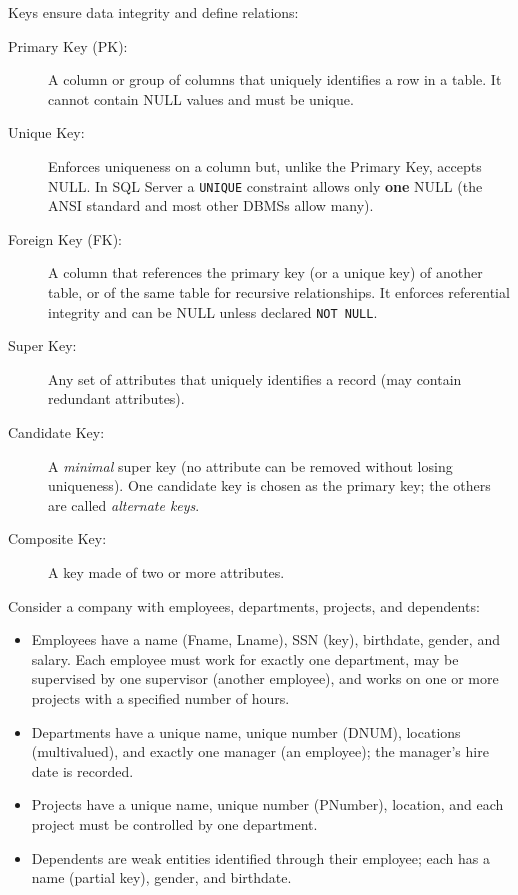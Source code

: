 \documentclass[11pt,a4paper]{article}
\makeatletter
\let\oldsubsection\subsection
\renewcommand{\subsection}{\@ifstar{\@gsubsubsection}{\@subsubsection}}
\newcommand{\@gsubsubsection}[1]{\subsubsection*{#1}}
\newcommand{\@subsubsection}[2][]{\subsubsection{#2}}
\renewcommand{\section}{\@ifstar{\@gsubsection}{\@subsectionnew}}
\newcommand{\@gsubsection}[1]{\oldsubsection*{#1}}
\newcommand{\@subsectionnew}[2][]{\oldsubsection{#2}}
\makeatother
\begin{document}
\section{Database Keys}
Keys ensure data integrity and define relations:
\begin{description}
    \item[Primary Key (PK):] A column or group of columns that uniquely identifies a row in a table. It cannot contain NULL values and must be unique.
    \item[Unique Key:] Enforces uniqueness on a column but, unlike the Primary Key, accepts NULL. In SQL Server a \texttt{UNIQUE} constraint allows only \textbf{one} NULL (the ANSI standard and most other DBMSs allow many).
    \item[Foreign Key (FK):] A column that references the primary key (or a unique key) of another table, or of the same table for recursive relationships. It enforces referential integrity and can be NULL unless declared \texttt{NOT NULL}.
    \item[Super Key:] Any set of attributes that uniquely identifies a record (may contain redundant attributes).
    \item[Candidate Key:] A \emph{minimal} super key (no attribute can be removed without losing uniqueness). One candidate key is chosen as the primary key; the others are called \emph{alternate keys}.
    \item[Composite Key:] A key made of two or more attributes.
\end{description}

\section{Company Case Study ERD}
Consider a company with employees, departments, projects, and dependents:
\begin{itemize}
    \item Employees have a name (Fname, Lname), SSN (key), birthdate, gender, and salary. Each employee must work for exactly one department, may be supervised by one supervisor (another employee), and works on one or more projects with a specified number of hours.
    \item Departments have a unique name, unique number (DNUM), locations (multivalued), and exactly one manager (an employee); the manager's hire date is recorded.
    \item Projects have a unique name, unique number (PNumber), location, and each project must be controlled by one department.
    \item Dependents are weak entities identified through their employee; each has a name (partial key), gender, and birthdate.
\end{itemize}
\end{document}
